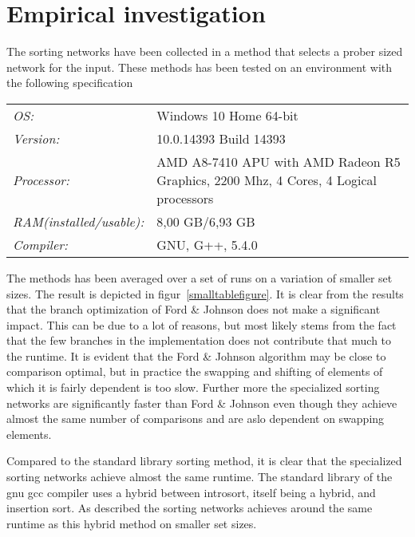 \section{Empirical investigation}
The sorting networks have been collected in a method that selects a prober sized network for the input. These methods has been tested on an environment with the following specification

\begin{tabular}{l p{6cm}}
	\textit{OS:} & Windows 10 Home 64-bit\\
	\textit{Version:} & 10.0.14393 Build 14393\\
	\textit{Processor:} & AMD A8-7410 APU with AMD Radeon R5 Graphics, 2200 Mhz, 4 Cores, 4 Logical processors\\
	\textit{RAM(installed/usable):} & 8,00 GB/6,93 GB\\
	\textit{Compiler:} & GNU, G++, 5.4.0
\end{tabular}


The methods has been averaged over a set of runs on a variation of smaller set sizes. The result is depicted in figur~\ref{smalltablefigure}. It is clear from the results that the branch optimization of Ford \& Johnson does not make a significant impact. This can be due to a lot of reasons, but most likely stems from the fact that the few branches in the implementation does not contribute that much to the runtime. It is evident that the Ford \& Johnson algorithm may be close to comparison optimal, but in practice the swapping and shifting of elements of which it is fairly dependent is too slow. Further more the specialized sorting networks are significantly faster than Ford \& Johnson even though they achieve almost the same number of comparisons and are aslo dependent on swapping elements.

Compared to the standard library sorting method, it is clear that the specialized sorting networks achieve almost the same runtime. The standard library of the gnu gcc compiler uses a hybrid between introsort, itself being a hybrid, and insertion sort\cite{gnustd}. As described the sorting networks achieves around the same runtime as this hybrid method on smaller set sizes.


